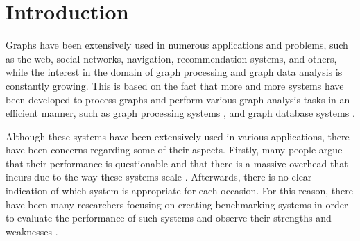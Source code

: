 \documentclass[a4paper,11pt]{article}
\begin{document}

\section{Introduction} \label{introduction}



\par Graphs have been extensively used in numerous applications and problems, such as the web, social networks, navigation, recommendation systems, and others, while the interest in the domain of graph processing and graph data analysis is constantly growing. This is based on the fact that more and more systems have been developed to process graphs and perform various graph analysis tasks in an efficient manner, such as graph processing systems \cite{naiad, timelydf,graphlab, flink, spark, graphxpaper, powergraph,pregel}, and graph database systems \cite{emptyheaded, neo4j, arangodb, orientdb}.

\par Although these systems have been extensively used in various applications, there have been concerns regarding some of their aspects. Firstly, many people argue that their performance is questionable and that there is a massive overhead that incurs due to the way these systems scale \cite{case-against, scalability-cost, challenges}. Afterwards, there is no clear indication of which system is appropriate for each occasion. For this reason, there have been many researchers focusing on creating benchmarking systems in order to evaluate the performance of such systems and observe their strengths and weaknesses \cite{benchmarking-vision, how-well, graphalytics, traversal-benchmarking}.
\end{document}

